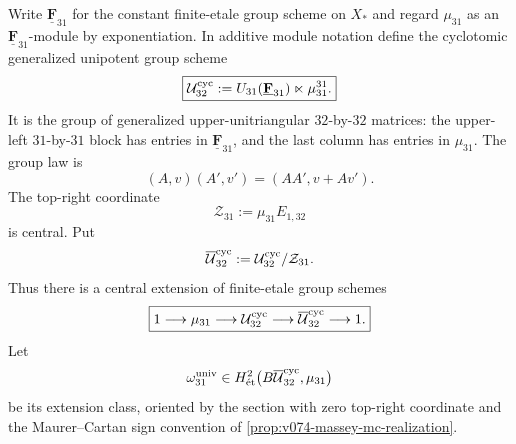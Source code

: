 \documentclass[11pt]{article}
\theoremstyle{remark}
\begin{document}
Write \(\underline{\mathbf F}_{31}\) for the constant finite-etale group
scheme on \(X_*\) and regard \(\mu_{31}\) as an
\(\underline{\mathbf F}_{31}\)-module by exponentiation.  In additive module
notation define the cyclotomic generalized unipotent group scheme
\begin{equation}\label{W31-eq:twisted-unipotent-group}
 \boxed{
 \mathcal U_{32}^{\rm cyc}
 :=U_{31}(\underline{\mathbf F}_{31})
   \ltimes\mu_{31}^{31}.}
\end{equation}
It is the group of generalized upper-unitriangular \(32\)-by-\(32\) matrices:
the upper-left \(31\)-by-\(31\) block has entries in
\(\underline{\mathbf F}_{31}\), and the last column has entries in
\(\mu_{31}\).  The group law is
\[
 (A,v)(A',v')=(AA',v+Av').
\]
The top-right coordinate
\[
 \mathcal Z_{31}:=\mu_{31}E_{1,32}
\]
is central.  Put
\[
 \overline{\mathcal U}_{32}^{\rm cyc}
 :=\mathcal U_{32}^{\rm cyc}/\mathcal Z_{31}.
\]
Thus there is a central extension of finite-etale group schemes
\begin{equation}\label{W31-eq:twisted-unipotent-extension}
 \boxed{
 1\longrightarrow\mu_{31}
 \longrightarrow\mathcal U_{32}^{\rm cyc}
 \longrightarrow\overline{\mathcal U}_{32}^{\rm cyc}
 \longrightarrow1.}
\end{equation}
Let
\[
 \omega_{31}^{\rm univ}
 \in H^2_{\mathrm{\acute et}}
 \bigl(B\overline{\mathcal U}_{32}^{\rm cyc},\mu_{31}\bigr)
\]
be its extension class, oriented by the section with zero top-right coordinate
and the Maurer--Cartan sign convention of
\cref{prop:v074-massey-mc-realization}.
\end{document}
